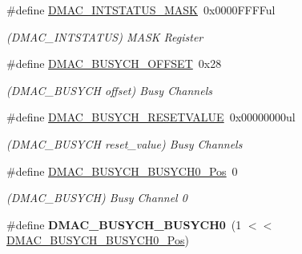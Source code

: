 \begin{DoxyCompactItemize}
\item 
\hypertarget{group___s_a_m_l21___d_m_a_c_ga329daa841c098764e9eb20797c80463d}{}\#define \hyperlink{group___s_a_m_l21___d_m_a_c_ga329daa841c098764e9eb20797c80463d}{D\+M\+A\+C\+\_\+\+I\+N\+T\+S\+T\+A\+T\+U\+S\+\_\+\+M\+A\+S\+K}~0x0000\+F\+F\+F\+Ful\label{group___s_a_m_l21___d_m_a_c_ga329daa841c098764e9eb20797c80463d}

\begin{DoxyCompactList}\small\item\em (D\+M\+A\+C\+\_\+\+I\+N\+T\+S\+T\+A\+T\+U\+S) M\+A\+S\+K Register \end{DoxyCompactList}\item 
\hypertarget{group___s_a_m_l21___d_m_a_c_gaaaf1fa557a15267ebf58381be60811e4}{}\#define \hyperlink{group___s_a_m_l21___d_m_a_c_gaaaf1fa557a15267ebf58381be60811e4}{D\+M\+A\+C\+\_\+\+B\+U\+S\+Y\+C\+H\+\_\+\+O\+F\+F\+S\+E\+T}~0x28\label{group___s_a_m_l21___d_m_a_c_gaaaf1fa557a15267ebf58381be60811e4}

\begin{DoxyCompactList}\small\item\em (D\+M\+A\+C\+\_\+\+B\+U\+S\+Y\+C\+H offset) Busy Channels \end{DoxyCompactList}\item 
\hypertarget{group___s_a_m_l21___d_m_a_c_ga2914b5ff6fe368b480727f50b1241137}{}\#define \hyperlink{group___s_a_m_l21___d_m_a_c_ga2914b5ff6fe368b480727f50b1241137}{D\+M\+A\+C\+\_\+\+B\+U\+S\+Y\+C\+H\+\_\+\+R\+E\+S\+E\+T\+V\+A\+L\+U\+E}~0x00000000ul\label{group___s_a_m_l21___d_m_a_c_ga2914b5ff6fe368b480727f50b1241137}

\begin{DoxyCompactList}\small\item\em (D\+M\+A\+C\+\_\+\+B\+U\+S\+Y\+C\+H reset\+\_\+value) Busy Channels \end{DoxyCompactList}\item 
\hypertarget{group___s_a_m_l21___d_m_a_c_ga090dc760b2f015efd88a6a06804670a5}{}\#define \hyperlink{group___s_a_m_l21___d_m_a_c_ga090dc760b2f015efd88a6a06804670a5}{D\+M\+A\+C\+\_\+\+B\+U\+S\+Y\+C\+H\+\_\+\+B\+U\+S\+Y\+C\+H0\+\_\+\+Pos}~0\label{group___s_a_m_l21___d_m_a_c_ga090dc760b2f015efd88a6a06804670a5}

\begin{DoxyCompactList}\small\item\em (D\+M\+A\+C\+\_\+\+B\+U\+S\+Y\+C\+H) Busy Channel 0 \end{DoxyCompactList}\item 
\hypertarget{group___s_a_m_l21___d_m_a_c_ga29b77c7dab5ad3d0f04ca0b04482d61a}{}\#define {\bfseries D\+M\+A\+C\+\_\+\+B\+U\+S\+Y\+C\+H\+\_\+\+B\+U\+S\+Y\+C\+H0}~(1 $<$$<$ \hyperlink{group___s_a_m_l21___d_m_a_c_ga090dc760b2f015efd88a6a06804670a5}{D\+M\+A\+C\+\_\+\+B\+U\+S\+Y\+C\+H\+\_\+\+B\+U\+S\+Y\+C\+H0\+\_\+\+Pos})\label{group___s_a_m_l21___d_m_a_c_ga29b77c7dab5ad3d0f04ca0b04482d61a}


\end{DoxyCompactItemize}
